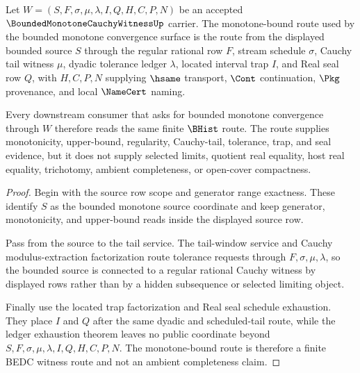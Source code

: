 \begin{theorem}
\label{thm:bounded-monotone-cauchy-witness-monotone-bound-route}
Let $W=(S,F,\sigma,\mu,\lambda,I,Q,H,C,P,N)$ be an accepted $\BoundedMonotoneCauchyWitnessUp$ carrier. The monotone-bound route used by the bounded monotone convergence surface is the route from the displayed bounded source $S$ through the regular rational row $F$, stream schedule $\sigma$, Cauchy tail witness $\mu$, dyadic tolerance ledger $\lambda$, located interval trap $I$, and Real seal row $Q$, with $H,C,P,N$ supplying $\hsame$ transport, $\Cont$ continuation, $\Pkg$ provenance, and local $\NameCert$ naming.

Every downstream consumer that asks for bounded monotone convergence through $W$ therefore reads the same finite $\BHist$ route. The route supplies monotonicity, upper-bound, regularity, Cauchy-tail, tolerance, trap, and seal evidence, but it does not supply selected limits, quotient real equality, host real equality, trichotomy, ambient completeness, or open-cover compactness.
\end{theorem}
\begin{proof}
Begin with the source row scope and generator range exactness. These identify $S$ as the bounded monotone source coordinate and keep generator, monotonicity, and upper-bound reads inside the displayed source row.

Pass from the source to the tail service. The tail-window service and Cauchy modulus-extraction factorization route tolerance requests through $F,\sigma,\mu,\lambda$, so the bounded source is connected to a regular rational Cauchy witness by displayed rows rather than by a hidden subsequence or selected limiting object.

Finally use the located trap factorization and Real seal schedule exhaustion. They place $I$ and $Q$ after the same dyadic and scheduled-tail route, while the ledger exhaustion theorem leaves no public coordinate beyond $S,F,\sigma,\mu,\lambda,I,Q,H,C,P,N$. The monotone-bound route is therefore a finite BEDC witness route and not an ambient completeness claim.
\end{proof}

